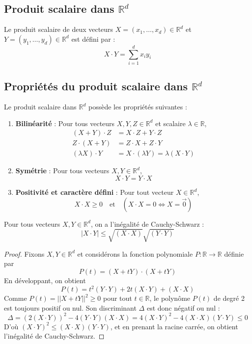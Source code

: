 \subsection{Produit scalaire dans $\mathbb{R}^d$}

\begin{definition}
Le produit scalaire de deux vecteurs $X = (x_1, \ldots, x_d) \in \mathbb{R}^d$ et $Y = (y_1, \ldots, y_d) \in \mathbb{R}^d$ est défini par :
\[
X \cdot Y = \sum_{i=1}^d x_i y_i
\]
\end{definition}

\subsection{Propriétés du produit scalaire dans $\mathbb{R}^d$}

Le produit scalaire dans $\mathbb{R}^d$ possède les propriétés suivantes :

\begin{enumerate}
    \item \textbf{Bilinéarité} :
    Pour tous vecteurs $X, Y, Z \in \mathbb{R}^d$ et scalaire $\lambda \in \mathbb{R}$,
    \begin{align*}
        (X + Y) \cdot Z &= X \cdot Z + Y \cdot Z \\
        Z \cdot (X + Y) &= Z \cdot X + Z \cdot Y \\
        (\lambda X) \cdot Y &= X \cdot (\lambda Y) = \lambda (X \cdot Y)
    \end{align*}
    \item \textbf{Symétrie} :
    Pour tous vecteurs $X, Y \in \mathbb{R}^d$,
    \[
    X \cdot Y = Y \cdot X
    \]
    \item \textbf{Positivité et caractère défini} :
    Pour tout vecteur $X \in \mathbb{R}^d$,
    \[
    X \cdot X \geq 0 \quad \text{et} \quad (X \cdot X = 0 \iff X = \overrightarrow{0})
    \]
\end{enumerate}

\begin{proposition}
Pour tous vecteurs $X, Y \in \mathbb{R}^d$, on a l'inégalité de Cauchy-Schwarz :
\[
|X \cdot Y| \leq \sqrt{(X \cdot X)} \sqrt{(Y \cdot Y)}
\]
\end{proposition}

\begin{proof}
Fixons $X, Y \in \mathbb{R}^d$ et considérons la fonction polynomiale $P : \mathbb{R} \to \mathbb{R}$ définie par
\[
P(t) = (X + tY) \cdot (X + tY)
\]
En développant, on obtient
\[
P(t) = t^2 (Y \cdot Y) + 2t (X \cdot Y) + (X \cdot X)
\]
Comme $P(t) = ||X + tY||^2 \geq 0$ pour tout $t \in \mathbb{R}$, le polynôme $P(t)$ de degré 2 est toujours positif ou nul. Son discriminant $\Delta$ est donc négatif ou nul :
\[
\Delta = (2(X \cdot Y))^2 - 4 (Y \cdot Y) (X \cdot X) = 4 (X \cdot Y)^2 - 4 (X \cdot X) (Y \cdot Y) \leq 0
\]
D'où $(X \cdot Y)^2 \leq (X \cdot X) (Y \cdot Y)$, et en prenant la racine carrée, on obtient l'inégalité de Cauchy-Schwarz.
\end{proof}


